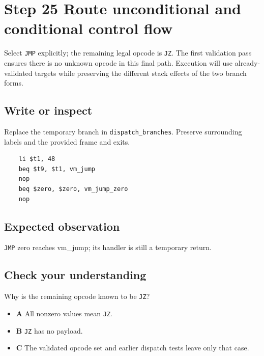 \section{Step 25 Route unconditional and conditional control flow}\label{vm-s25}

Select \texttt{JMP} explicitly; the remaining legal opcode is \texttt{JZ}. The first validation pass ensures there is no unknown opcode in this final path. Execution will use already-validated targets while preserving the different stack effects of the two branch forms.

\subsection{Write or inspect}
Replace the temporary branch in \texttt{dispatch\_branches}. Preserve surrounding labels and the provided frame and exits.

\begin{verbatim}
    li $t1, 48
    beq $t9, $t1, vm_jump
    nop
    beq $zero, $zero, vm_jump_zero
    nop
\end{verbatim}
\subsection{Expected observation}
\texttt{JMP} zero reaches vm\_jump; its handler is still a temporary return.

\subsection{Check your understanding}
Why is the remaining opcode known to be \texttt{JZ}?

\begin{itemize}
  \item \textbf{A} All nonzero values mean \texttt{JZ}.
  \item \textbf{B} \texttt{JZ} has no payload.
  \item \textbf{C} The validated opcode set and earlier dispatch tests leave only that case.
\end{itemize}
